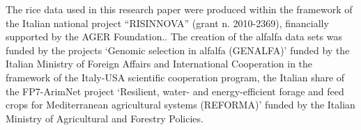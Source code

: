 \begin{acknowledgements}
The rice data used in this research paper were produced within the framework of the Italian national project ``RISINNOVA'' (grant n. 2010-2369), financially supported by the AGER Foundation..
The creation of the alfalfa data sets was funded by the projects ‘Genomic selection in alfalfa (GENALFA)’ funded by the Italian Ministry of Foreign Affairs and International Cooperation in the framework of the Italy-USA scientific cooperation program, the Italian share of the FP7-ArimNet project ‘Resilient, water- and energy-efficient forage and feed crops for Mediterranean agricultural systems (REFORMA)’ funded by the Italian Ministry of Agricultural and Forestry Policies.
\end{acknowledgements}


